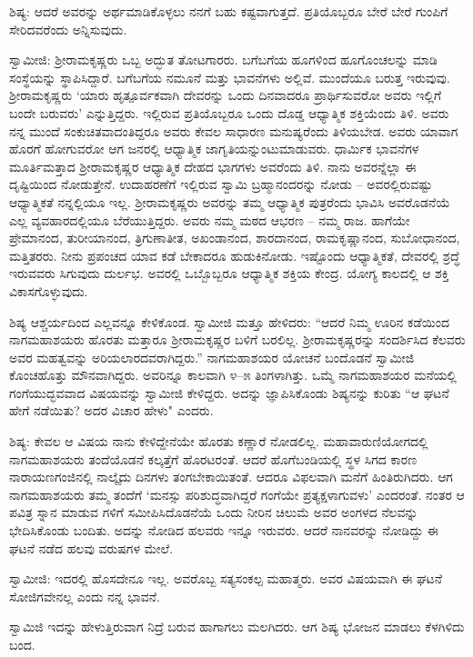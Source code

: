 ಶಿಷ್ಯ: ಆದರೆ ಅವರನ್ನು ಅರ್ಥಮಾಡಿಕೊಳ್ಳಲು ನನಗೆ ಬಹು ಕಷ್ಟವಾಗುತ್ತದೆ. ಪ್ರತಿಯೊಬ್ಬರೂ ಬೇರೆ ಬೇರೆ ಗುಂಪಿಗೆ ಸೇರಿದವರೆಂದು ಅನ್ನಿಸುವುದು.

ಸ್ವಾಮೀಜಿ: ಶ‍್ರೀರಾಮಕೃಷ್ಣರು ಒಬ್ಬ ಅದ್ಭುತ ತೋಟಗಾರರು. ಬಗೆಬಗೆಯ ಹೂಗಳಿಂದ ಹೂಗೊಂಚಲನ್ನು ಮಾಡಿ ಸಂಸ್ಥೆಯನ್ನು ಸ್ಥಾಪಿಸಿದ್ದಾರೆ. ಬಗೆಬಗೆಯ ನಮೂನೆ ಮತ್ತು ಭಾವನೆಗಳು ಅಲ್ಲಿವೆ. ಮುಂದೆಯೂ ಬರುತ್ತ ಇರುವುವು. ಶ‍್ರೀರಾಮಕೃಷ್ಣರು ‘ಯಾರು ಹೃತ್ಪೂರ್ವಕವಾಗಿ ದೇವರನ್ನು ಒಂದು ದಿನವಾದರೂ ಪ್ರಾರ್ಥಿಸುವರೋ ಅವರು ಇಲ್ಲಿಗೆ ಬಂದೇ ಬರುವರು’ ಎನ್ನುತ್ತಿದ್ದರು. ಇಲ್ಲಿರುವ ಪ್ರತಿಯೊಬ್ಬರೂ ಒಂದು ದೊಡ್ಡ ಆಧ್ಯಾತ್ಮಿಕ ಶಕ್ತಿಯೆಂದು ತಿಳಿ. ಅವರು ನನ್ನ ಮುಂದೆ ಸಂಕುಚಿತವಾದಂತಿದ್ದರೂ ಅವರು ಕೇವಲ ಸಾಧಾರಣ ಮನುಷ್ಯರೆಂದು ತಿಳಿಯಬೇಡ. ಅವರು ಯಾವಾಗ ಹೊರಗೆ ಹೋಗುವರೋ ಆಗ ಜನರಲ್ಲಿ ಆಧ್ಯಾತ್ಮಿಕ ಜಾಗೃತಿಯನ್ನುಂಟುಮಾಡುವರು. ಧಾರ್ಮಿಕ ಭಾವನೆಗಳ ಮೂರ್ತಿಮತ್ತಾದ ಶ‍್ರೀರಾಮಕೃಷ್ಣರ ಆಧ್ಯಾತ್ಮಿಕ ದೇಹದ ಭಾಗಗಳು ಅವರೆಂದು ತಿಳಿ. ನಾನು ಅವರನ್ನೆಲ್ಲಾ ಈ ದೃಷ್ಟಿಯಿಂದ ನೋಡುತ್ತೇನೆ. ಉದಾಹರಣೆಗೆ ಇಲ್ಲಿರುವ ಸ್ವಾಮಿ ಬ್ರಹ್ಮಾನಂದರನ್ನು ನೋಡು – ಅವರಲ್ಲಿರುವಷ್ಟು ಆಧ್ಯಾತ್ಮಿಕತೆ ನನ್ನಲ್ಲಿಯೂ ಇಲ್ಲ. ಶ‍್ರೀರಾಮಕೃಷ್ಣರು ಅವರನ್ನು ತಮ್ಮ ಆಧ್ಯಾತ್ಮಿಕ ಪುತ್ರರೆಂದು ಭಾವಿಸಿ ಅವರೊಡನೆಯೆ ಎಲ್ಲ ವ್ಯವಹಾರದಲ್ಲಿಯೂ ಬೆರೆಯುತ್ತಿದ್ದರು. ಅವರು ನಮ್ಮ ಮಠದ ಆಭರಣ – ನಮ್ಮ ರಾಜ. ಹಾಗೆಯೇ ಪ್ರೇಮಾನಂದ, ತುರೀಯಾನಂದ, ತ್ರಿಗುಣಾತೀತ, ಅಖಂಡಾನಂದ, ಶಾರದಾನಂದ, ರಾಮಕೃಷ್ಣಾನಂದ, ಸುಬೋಧಾನಂದ, ಮತ್ತಿತರರು. ನೀನು ಪ್ರಪಂಚದ ಯಾವ ಕಡೆ ಬೇಕಾದರೂ ಹುಡುಕಿನೋಡು. ಇಷ್ಟೊಂದು ಆಧ್ಯಾತ್ಮಿಕತೆ, ದೇವರಲ್ಲಿ ಶ್ರದ್ಧೆ ಇರುವವರು ಸಿಗುವುದು ದುರ್ಲಭ. ಅವರಲ್ಲಿ ಒಬ್ಬೊಬ್ಬರೂ ಆಧ್ಯಾತ್ಮಿಕ ಶಕ್ತಿಯ ಕೇಂದ್ರ. ಯೋಗ್ಯ ಕಾಲದಲ್ಲಿ ಆ ಶಕ್ತಿ ವಿಕಾಸಗೊಳ್ಳುವುದು.

ಶಿಷ್ಯ ಆಶ್ಚರ್ಯದಿಂದ ಎಲ್ಲವನ್ನೂ ಕೇಳಿಕೊಂಡ. ಸ್ವಾಮೀಜಿ ಮತ್ತೂ ಹೇಳಿದರು: “ಆದರೆ ನಿಮ್ಮ ಊರಿನ ಕಡೆಯಿಂದ ನಾಗಮಹಾಶಯರು ಹೊರತು ಮತ್ತಾರೂ ಶ‍್ರೀರಾಮಕೃಷ್ಣರ ಬಳಿಗೆ ಬರಲಿಲ್ಲ. ಶ‍್ರೀರಾಮಕೃಷ್ಣರನ್ನು ಸಂದರ್ಶಿಸಿದ ಕೆಲವರು ಅವರ ಮಹತ್ವವನ್ನು ಅರಿಯಲಾರದವರಾಗಿದ್ದರು.” ನಾಗಮಹಾಶಯರ ಯೋಚನೆ ಬಂದೊಡನೆ ಸ್ವಾಮೀಜಿ ಕೊಂಚಹೊತ್ತು ಮೌನವಾಗಿದ್ದರು. ಅವರಿನ್ನೂ ಕಾಲವಾಗಿ ೪–೫ ತಿಂಗಳಾಗಿತ್ತು. ಒಮ್ಮೆ ನಾಗಮಹಾಶಯರ ಮನೆಯಲ್ಲಿ ಗಂಗೆಯುದ್ಭವವಾದ ವಿಷಯವನ್ನು ಸ್ವಾಮೀಜಿ ಕೇಳಿದ್ದರು. ಅದನ್ನು ಜ್ಞಾಪಿಸಿಕೊಂಡು ಶಿಷ್ಯನನ್ನು ಕುರಿತು “ಆ ಘಟನೆ ಹೇಗೆ ನಡೆಯಿತು? ಅದರ ವಿಚಾರ ಹೇಳು" ಎಂದರು.

ಶಿಷ್ಯ: ಕೇವಲ ಆ ವಿಷಯ ನಾನು ಕೇಳಿದ್ದೇನೆಯೇ ಹೊರತು ಕಣ್ಣಾರೆ ನೋಡಲಿಲ್ಲ. ಮಹಾವಾರುಣಿಯೋಗದಲ್ಲಿ ನಾಗಮಹಾಶಯರು ತಂದೆಯೊಡನೆ ಕಲ್ಕತ್ತೆಗೆ ಹೊರಟರಂತೆ. ಆದರೆ ಹೊಗೆಬಂಡಿಯಲ್ಲಿ ಸ್ಥಳ ಸಿಗದ ಕಾರಣ ನಾರಾಯಣಗಂಜಿನಲ್ಲಿ ನಾಲ್ಕೈದು ದಿನಗಳು ತಂಗಬೇಕಾಯಿತಂತೆ. ಆದರೂ ವಿಫಲವಾಗಿ ಮನೆಗೆ ಹಿಂತಿರುಗಿದರು. ಆಗ ನಾಗಮಹಾಶಯರು ತಮ್ಮ ತಂದೆಗೆ ‘ಮನಸ್ಸು ಪರಿಶುದ್ಧವಾಗಿದ್ದರೆ ಗಂಗೆಯೇ ಪ್ರತ್ಯಕ್ಷಳಾಗುವಳು’ ಎಂದರಂತೆ. ನಂತರ ಆ ಪವಿತ್ರ ಸ್ನಾನ ಮಾಡುವ ಗಳಿಗೆ ಸಮೀಪಿಸಿದೊಡನೆಯೆ ಒಂದು ನೀರಿನ ಚಿಲುಮೆ ಅವರ ಅಂಗಳದ ನೆಲವನ್ನು ಭೇದಿಸಿಕೊಂಡು ಬಂದಿತು. ಅದನ್ನು ನೋಡಿದ ಹಲವರು ಇನ್ನೂ ಇರುವರು. ಆದರೆ ನಾನವರನ್ನು ನೋಡಿದ್ದು ಈ ಘಟನೆ ನಡೆದ ಹಲವು ವರುಷಗಳ ಮೇಲೆ.

ಸ್ವಾಮೀಜಿ: ಇದರಲ್ಲಿ ಹೊಸದೇನೂ ಇಲ್ಲ. ಅವರೊಬ್ಬ ಸತ್ಯಸಂಕಲ್ಪ ಮಹಾತ್ಮರು. ಅವರ ವಿಷಯವಾಗಿ ಈ ಘಟನೆ ಸೋಜಿಗವೇನಲ್ಲ ಎಂದು ನನ್ನ ಭಾವನೆ.

ಸ್ವಾಮಿಜಿ ಇದನ್ನು ಹೇಳುತ್ತಿರುವಾಗ ನಿದ್ರೆ ಬರುವ ಹಾಗಾಗಲು ಮಲಗಿದರು. ಆಗ ಶಿಷ್ಯ ಭೋಜನ ಮಾಡಲು ಕೆಳಗಿಳಿದು ಬಂದ.

